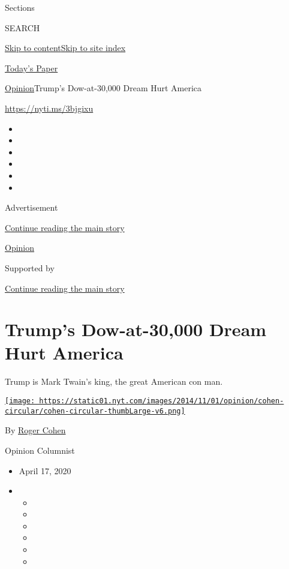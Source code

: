 Sections

SEARCH

\protect\hyperlink{site-content}{Skip to
content}\protect\hyperlink{site-index}{Skip to site index}

\href{https://myaccount.nytimes.com/auth/login?response_type=cookie\&client_id=vi}{}

\href{https://www.nytimes.com/section/todayspaper}{Today's Paper}

\href{/section/opinion}{Opinion}\textbar{}Trump's Dow-at-30,000 Dream
Hurt America

\href{https://nyti.ms/3bjgixu}{https://nyti.ms/3bjgixu}

\begin{itemize}
\item
\item
\item
\item
\item
\item
\end{itemize}

Advertisement

\protect\hyperlink{after-top}{Continue reading the main story}

\href{/section/opinion}{Opinion}

Supported by

\protect\hyperlink{after-sponsor}{Continue reading the main story}

\hypertarget{trumps-dow-at-30000-dream-hurt-america}{%
\section{Trump's Dow-at-30,000 Dream Hurt
America}\label{trumps-dow-at-30000-dream-hurt-america}}

Trump is Mark Twain's king, the great American con man.

\href{https://www.nytimes.com/by/roger-cohen}{\texttt{[image: https://static01.nyt.com/images/2014/11/01/opinion/cohen-circular/cohen-circular-thumbLarge-v6.png]}}

By \href{https://www.nytimes.com/by/roger-cohen}{Roger Cohen}

Opinion Columnist

\begin{itemize}
\item
  April 17, 2020
\item
  \begin{itemize}
  \item
  \item
  \item
  \item
  \item
  \item
  \end{itemize}
\end{itemize}

